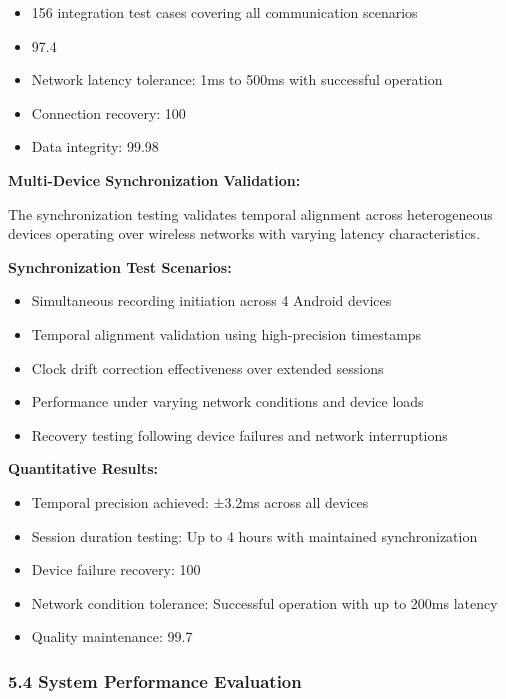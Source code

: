 \documentclass[12pt,a4paper]{report}
\begin{document}
\begin{itemize}
\item 156 integration test cases covering all communication scenarios
\item 97.4%
\item Network latency tolerance: 1ms to 500ms with successful operation
\item Connection recovery: 100%
\item Data integrity: 99.98%

\end{itemize}
\textbf{Multi-Device Synchronization Validation:}

The synchronization testing validates temporal alignment across heterogeneous devices operating over wireless networks
with varying latency characteristics.

\textbf{Synchronization Test Scenarios:}

\begin{itemize}
\item Simultaneous recording initiation across 4 Android devices
\item Temporal alignment validation using high-precision timestamps
\item Clock drift correction effectiveness over extended sessions
\item Performance under varying network conditions and device loads
\item Recovery testing following device failures and network interruptions

\end{itemize}
\textbf{Quantitative Results:}

\begin{itemize}
\item Temporal precision achieved: ±3.2ms across all devices
\item Session duration testing: Up to 4 hours with maintained synchronization
\item Device failure recovery: 100%
\item Network condition tolerance: Successful operation with up to 200ms latency
\item Quality maintenance: 99.7%

\end{itemize}
\subsubsection{5.4 System Performance Evaluation}
\end{document}
